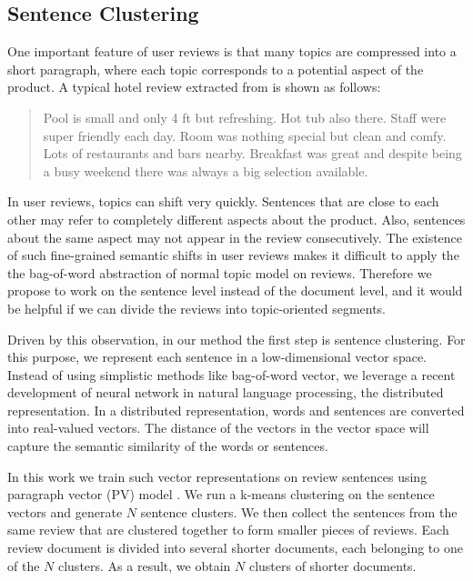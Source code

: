 \subsection{Sentence Clustering}

One important feature of user reviews is that many topics are 
compressed into a short paragraph, where each topic corresponds to 
a potential aspect of the product. 
A typical hotel review extracted from  
is shown as follows:

\begin{quote}
Pool is small and only 4 ft but refreshing. Hot tub also there. Staff were super friendly each day. Room was nothing special but clean and comfy. Lots of restaurants and bars nearby. Breakfast was great and despite being a busy weekend there was always a big selection available.
\end{quote}

In user reviews, topics can shift very quickly.
Sentences that are close to each other may refer to 
completely different aspects about the product. Also,
sentences about the same aspect may not appear in the review consecutively. 
The existence of such fine-grained semantic shifts in user reviews 
makes it difficult to apply the the bag-of-word abstraction 
of normal topic model on reviews.
Therefore we propose to work on the sentence level instead 
of the document level, and it would be helpful if we can divide the 
reviews into topic-oriented segments.

Driven by this observation, in our method the first step is 
sentence clustering.  
For this purpose, we represent each 
sentence in a low-dimensional vector space.
Instead of using simplistic methods like bag-of-word vector, 
we leverage a recent development of neural network in natural 
language processing, the distributed representation.
In a distributed representation, words and sentences are 
converted into real-valued vectors.
The distance of the vectors in the vector space will capture the 
semantic similarity of the words or sentences.

In this work we train such vector representations on review sentences using paragraph vector (PV) model \cite{le2014distributed}.
We run a k-means clustering on the sentence vectors and generate 
$N$ sentence clusters. We then collect the sentences from the same review 
that are clustered together to form smaller pieces of reviews. 
Each review document is divided into several shorter documents, each belonging
to one of the $N$ clusters. As a result, we obtain $N$ clusters of shorter documents. 

